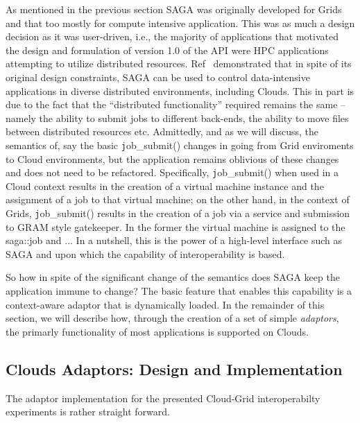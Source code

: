\documentclass[conference,final]{IEEEtran}
\begin{document}
As mentioned in the previous section SAGA was originally developed for
Grids and that too mostly for compute intensive application. This was
as much a design decision as it was user-driven, i.e., the majority of
applications that motivated the design and formulation of version 1.0
of the API were HPC applications attempting to utilize distributed
resources.  Ref~\cite{saga_ccgrid09} demonstrated that in spite of its
original design constraints, SAGA can be used to control
data-intensive applications in diverse distributed environments,
including Clouds.  This in part is due to the fact that the
``distributed functionality'' required remains the same -- namely the
ability to submit jobs to different back-ends, the ability to move
files between distributed resources etc. Admittedly, and as we will
discuss, the semantics of, say the basic {\texttt job\_submit()}
changes in going from Grid enviroments to Cloud environments, but the
application remains oblivious of these changes and does not need to be
refactored. Specifically, {\texttt job\_submit()} when used in a Cloud
context results in the creation of a virtual machine instance and the
assignment of a job to that virtual machine; on the other hand, in the
context of Grids, {\texttt job\_submit()} results in the creation of a
job via a service and submission to GRAM style gatekeeper. In the
former the virtual machine is assigned to the saga::job and ...  In a
nutshell, this is the power of a high-level interface such as SAGA and
upon which the capability of interoperability is based.

So how in spite of the significant change of the semantics does SAGA
keep the application immune to change? The basic feature that enables
this capability is a context-aware adaptor that is dynamically loaded.
In the remainder of this section, we will describe how, through the
creation of a set of simple {\it adaptors}, the primarly functionality
of most applications is supported on Clouds.

\subsection{Clouds Adaptors: Design and Implementation}


The adaptor implementation for the presented Cloud-Grid
interoperabilty experiments is rather straight forward. 
 
\end{document}
